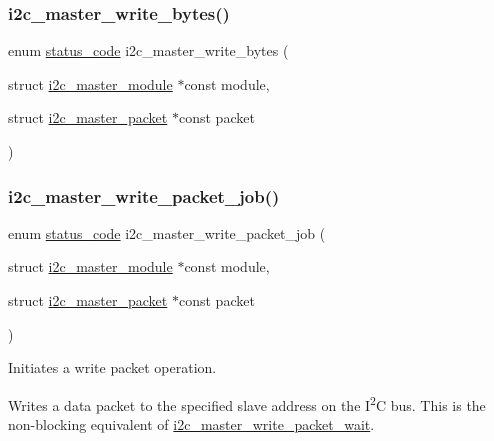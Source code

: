 \subsubsection{\texorpdfstring{i2c\_master\_write\_bytes()}{i2c\_master\_write\_bytes()}}
{\footnotesize\ttfamily enum \mbox{\hyperlink{group__group__sam0__utils__status__codes_ga751c892e5a46b8e7d282085a5a5bf151}{status\+\_\+code}} i2c\+\_\+master\+\_\+write\+\_\+bytes (\begin{DoxyParamCaption}\item[{struct \mbox{\hyperlink{structi2c__master__module}{i2c\+\_\+master\+\_\+module}} $\ast$const}]{module,  }\item[{struct \mbox{\hyperlink{structi2c__master__packet}{i2c\+\_\+master\+\_\+packet}} $\ast$const}]{packet }\end{DoxyParamCaption})}

\mbox{\label{group__asfdoc__sam0__sercom__i2c__group_ga5527434ebf5f0442a9f9ed9146005cba}} 
\subsubsection{\texorpdfstring{i2c\_master\_write\_packet\_job()}{i2c\_master\_write\_packet\_job()}}
{\footnotesize\ttfamily enum \mbox{\hyperlink{group__group__sam0__utils__status__codes_ga751c892e5a46b8e7d282085a5a5bf151}{status\+\_\+code}} i2c\+\_\+master\+\_\+write\+\_\+packet\+\_\+job (\begin{DoxyParamCaption}\item[{struct \mbox{\hyperlink{structi2c__master__module}{i2c\+\_\+master\+\_\+module}} $\ast$const}]{module,  }\item[{struct \mbox{\hyperlink{structi2c__master__packet}{i2c\+\_\+master\+\_\+packet}} $\ast$const}]{packet }\end{DoxyParamCaption})}



Initiates a write packet operation. 

Writes a data packet to the specified slave address on the I\textsuperscript{2}C bus. This is the non-\/blocking equivalent of \mbox{\hyperlink{group__asfdoc__sam0__sercom__i2c__group_ga6c07057fe2534e8b4a3ce2cfe2dafc1b}{i2c\+\_\+master\+\_\+write\+\_\+packet\+\_\+wait}}.


